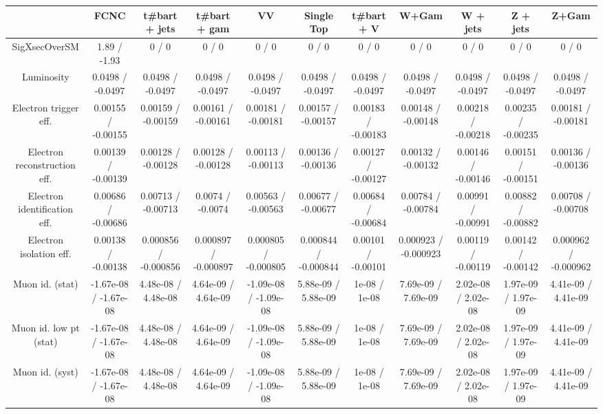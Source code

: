\begin{table}[htbp]
\begin{center}
\footnotesize
\begin{tabular}{|c|c|c|c|c|c|c|c|c|c|c|}
\hline 
      & FCNC      & t#bar{t} + jets      & t#bar{t} +  gam      & VV      & Single Top      & t#bar{t} + V      & W+Gam      & W + jets      & Z + jets      & Z+Gam \\ 
\hline 
 SigXsecOverSM & 1.89 / -1.93 & 0 / 0 & 0 / 0 & 0 / 0 & 0 / 0 & 0 / 0 & 0 / 0 & 0 / 0 & 0 / 0 & 0 / 0 \\ 
  Luminosity & 0.0498 / -0.0497 & 0.0498 / -0.0497 & 0.0498 / -0.0497 & 0.0498 / -0.0497 & 0.0498 / -0.0497 & 0.0498 / -0.0497 & 0.0498 / -0.0497 & 0.0498 / -0.0497 & 0.0498 / -0.0497 & 0.0498 / -0.0497 \\ 
  Electron trigger eff. & 0.00155 / -0.00155 & 0.00159 / -0.00159 & 0.00161 / -0.00161 & 0.00181 / -0.00181 & 0.00157 / -0.00157 & 0.00183 / -0.00183 & 0.00148 / -0.00148 & 0.00218 / -0.00218 & 0.00235 / -0.00235 & 0.00181 / -0.00181 \\ 
  Electron reconstruction eff. & 0.00139 / -0.00139 & 0.00128 / -0.00128 & 0.00128 / -0.00128 & 0.00113 / -0.00113 & 0.00136 / -0.00136 & 0.00127 / -0.00127 & 0.00132 / -0.00132 & 0.00146 / -0.00146 & 0.00151 / -0.00151 & 0.00136 / -0.00136 \\ 
  Electron identification eff. & 0.00686 / -0.00686 & 0.00713 / -0.00713 & 0.0074 / -0.0074 & 0.00563 / -0.00563 & 0.00677 / -0.00677 & 0.00684 / -0.00684 & 0.00784 / -0.00784 & 0.00991 / -0.00991 & 0.00882 / -0.00882 & 0.00708 / -0.00708 \\ 
  Electron isolation eff. & 0.00138 / -0.00138 & 0.000856 / -0.000856 & 0.000897 / -0.000897 & 0.000805 / -0.000805 & 0.000844 / -0.000844 & 0.00101 / -0.00101 & 0.000923 / -0.000923 & 0.00119 / -0.00119 & 0.00142 / -0.00142 & 0.000962 / -0.000962 \\ 
  Muon id. (stat) & -1.67e-08 / -1.67e-08 & 4.48e-08 / 4.48e-08 & 4.64e-09 / 4.64e-09 & -1.09e-08 / -1.09e-08 & 5.88e-09 / 5.88e-09 & 1e-08 / 1e-08 & 7.69e-09 / 7.69e-09 & 2.02e-08 / 2.02e-08 & 1.97e-09 / 1.97e-09 & 4.41e-09 / 4.41e-09 \\ 
  Muon id. low pt (stat) & -1.67e-08 / -1.67e-08 & 4.48e-08 / 4.48e-08 & 4.64e-09 / 4.64e-09 & -1.09e-08 / -1.09e-08 & 5.88e-09 / 5.88e-09 & 1e-08 / 1e-08 & 7.69e-09 / 7.69e-09 & 2.02e-08 / 2.02e-08 & 1.97e-09 / 1.97e-09 & 4.41e-09 / 4.41e-09 \\ 
  Muon id. (syst) & -1.67e-08 / -1.67e-08 & 4.48e-08 / 4.48e-08 & 4.64e-09 / 4.64e-09 & -1.09e-08 / -1.09e-08 & 5.88e-09 / 5.88e-09 & 1e-08 / 1e-08 & 7.69e-09 / 7.69e-09 & 2.02e-08 / 2.02e-08 & 1.97e-09 / 1.97e-09 & 4.41e-09 / 4.41e-09 \\ 

\end{tabular}
\end{center}
\end{table}
